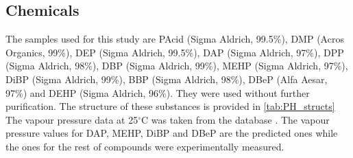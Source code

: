 \subsection{Chemicals}
The samples used for this study  are
%
%
PAcid (Sigma Aldrich, 99.5\%),                              %
DMP (Acros Organics, 99\%),                     %
DEP (Sigma Aldrich, 99.5\%),                     %
DAP (Sigma Aldrich, 97\%),                       %
DPP (Sigma Aldrich, 98\%),                      %
DBP (Sigma Aldrich, 99\%),                       %
MEHP (Sigma Aldrich, 97\%),               %
DiBP (Sigma Aldrich, 99\%),                   %
BBP (Sigma Aldrich, 98\%),                  %
DBeP (Alfa Aesar, 97\%)                         %
and
DEHP (Sigma Aldrich, 96\%). %
%
%
%
%
%
%
%
%
They were used without further purification.
%
The structure of these substances is provided in \autoref{tab:PH_structs}
%
The vapour pressure data at 25$^\circ$C was taken from the \citeauthor{USAEPA} database \cite{USAEPA}. The vapour pressure values for DAP, MEHP, DiBP and DBeP are the predicted ones while the ones for the rest of compounds were experimentally measured.



